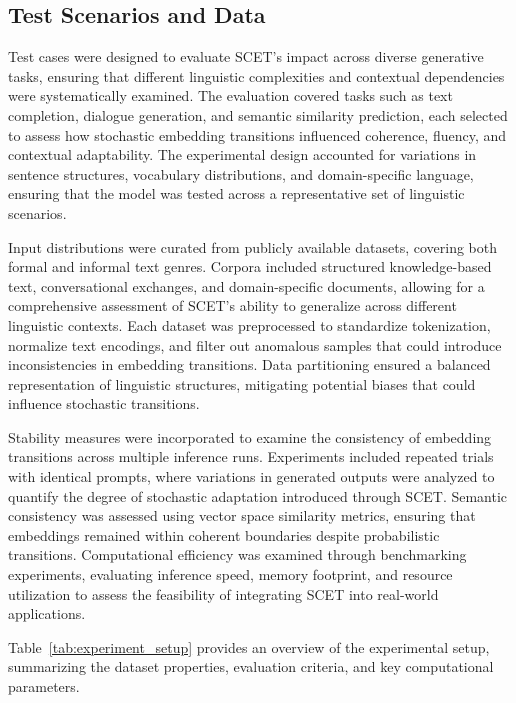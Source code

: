 \documentclass{article}
\begin{document}
\subsection{Test Scenarios and Data}

Test cases were designed to evaluate SCET's impact across diverse generative tasks, ensuring that different linguistic complexities and contextual dependencies were systematically examined. The evaluation covered tasks such as text completion, dialogue generation, and semantic similarity prediction, each selected to assess how stochastic embedding transitions influenced coherence, fluency, and contextual adaptability. The experimental design accounted for variations in sentence structures, vocabulary distributions, and domain-specific language, ensuring that the model was tested across a representative set of linguistic scenarios.

Input distributions were curated from publicly available datasets, covering both formal and informal text genres. Corpora included structured knowledge-based text, conversational exchanges, and domain-specific documents, allowing for a comprehensive assessment of SCET’s ability to generalize across different linguistic contexts. Each dataset was preprocessed to standardize tokenization, normalize text encodings, and filter out anomalous samples that could introduce inconsistencies in embedding transitions. Data partitioning ensured a balanced representation of linguistic structures, mitigating potential biases that could influence stochastic transitions.

Stability measures were incorporated to examine the consistency of embedding transitions across multiple inference runs. Experiments included repeated trials with identical prompts, where variations in generated outputs were analyzed to quantify the degree of stochastic adaptation introduced through SCET. Semantic consistency was assessed using vector space similarity metrics, ensuring that embeddings remained within coherent boundaries despite probabilistic transitions. Computational efficiency was examined through benchmarking experiments, evaluating inference speed, memory footprint, and resource utilization to assess the feasibility of integrating SCET into real-world applications.

Table~\ref{tab:experiment_setup} provides an overview of the experimental setup, summarizing the dataset properties, evaluation criteria, and key computational parameters.
\end{document}
